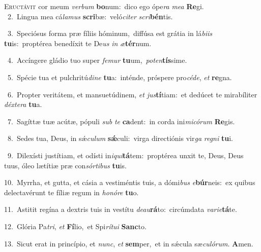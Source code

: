 \lettrine{\initial\textcolor{\initialcolor}{E}}{ructávit} cor meum \textit{ver}\-\textit{bum} \textbf{bo}\-num:~\star dico ego ópe\textit{ra} \textit{me}\-\textit{a} \textbf{Re}\-gi.\\
{\numbfont\textcolor{\numbcolor}{~2.}}~Lingua mea cá\-\textit{la}\-\textit{mus} \textbf{scri}\-bæ:~\star veló\-\textit{ci}\-\textit{ter} \textit{scri}\-\textbf{bén}tis.\par
{\numbfont\textcolor{\numbcolor}{~3.}}~Speciósus forma præ fíliis hóminum,~\dagger diffúsa est grátia in lá\-\textit{bi}\-\textit{is} \textbf{tu}\-is:~\star proptérea benedíxit te De\textit{us} \textit{in} \textit{æ}\-\textbf{tér}num.\par
{\numbfont\textcolor{\numbcolor}{~4.}}~Accíngere gládio tuo super \textit{fe}\-\textit{mur} \textbf{tu}\-um,~\star \textit{pot}\-\textit{en}\textbf{tís}sime.\par
{\numbfont\textcolor{\numbcolor}{~5.}}~Spécie tua et pulchritú\-\textit{di}\-\textit{ne} \textbf{tu}\-a:~\star inténde, próspere pro\-\textit{cé}\-\textit{de}, \textit{et} \textbf{re}\-gna.\par
{\numbfont\textcolor{\numbcolor}{~6.}}~Propter veritátem, et mansuetúdinem, \textit{et} \textit{jus}\-\textbf{tí}tiam:~\star et dedúcet te mirabíliter \textit{déx}\-\textit{te}\textit{ra} \textbf{tu}\-a.\par
{\numbfont\textcolor{\numbcolor}{~7.}}~Sagíttæ tuæ acútæ, pópuli \textit{sub} \textit{te} \textbf{ca}\-dent:~\star in corda ini\-\textit{mi}\-\textit{có}\textit{rum} \textbf{Re}\-gis.\par
{\numbfont\textcolor{\numbcolor}{~8.}}~Sedes tua, Deus, in sǽ\-\textit{cu}\-\textit{lum} \textbf{sǽ}\-culi:~\star virga directiónis vir\textit{ga} \textit{re}\-\textit{gni} \textbf{tu}\-i.\par
{\numbfont\textcolor{\numbcolor}{~9.}}~Dilexísti justítiam, et odísti in\-\textit{i}\-\textit{qui}\textbf{tá}tem:~\star proptérea unxit te, Deus, Deus tuus, óleo lætítiæ præ con\-\textit{sór}\-\textit{ti}\textit{bus} \textbf{tu}\-is.\par
{\numbfont\textcolor{\numbcolor}{10.}}~Myrrha, et gutta, et cásia a vestiméntis tuis, a dómi\textit{bus} \textit{e}\-\textbf{búr}neis:~\star ex quibus delectavérunt te fíliæ regum in \textit{ho}\-\textit{nó}\textit{re} \textbf{tu}\-o.\par
{\numbfont\textcolor{\numbcolor}{11.}}~Astitit regína a dextris tuis in vestítu \textit{de}\-\textit{au}\textbf{rá}to:~\star circúmdata \textit{va}\-\textit{ri}\textit{e}\textbf{tá}te.\par
{\numbfont\textcolor{\numbcolor}{12.}}~Glória Pa\-\textit{tri}\-, \textit{et} \textbf{Fí}\-lio,~\star et Spi\-\textit{rí}\-\textit{tu}\textit{i} \textbf{Sanc}\-to.\par
{\numbfont\textcolor{\numbcolor}{13.}}~Sicut erat in princípio, et \textit{nunc}\-, \textit{et} \textbf{sem}\-per,~\star et in sǽcula sæ\-\textit{cu}\-\textit{ló}\textit{rum}. \textbf{A}\-men.\par
